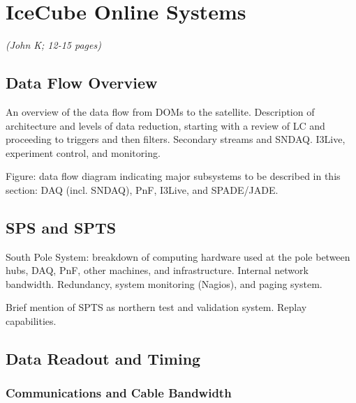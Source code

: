 
\section{IceCube Online Systems}
\label{sec:online}
\textsl{(John K; 12-15 pages)}


\subsection{Data Flow Overview}

An overview of the data flow from DOMs to the satellite.  Description of
architecture and levels of data reduction, starting with a review of LC and
proceeding to triggers and then filters.  Secondary streams and SNDAQ.
I3Live, experiment control, and monitoring.

Figure: data flow diagram indicating major subsystems to be described in
this section: DAQ (incl. SNDAQ), PnF, I3Live, and SPADE/JADE.

\subsection{SPS and SPTS}

South Pole System: breakdown of computing hardware used at the pole between
hubs, DAQ, PnF, other machines, and infrastructure.  Internal network
bandwidth.  Redundancy, system monitoring (Nagios), and paging system.

Brief mention of SPTS as northern test and validation system.  Replay
capabilities.  

\subsection{Data Readout and Timing}
\subsubsection{Communications and Cable Bandwidth}

